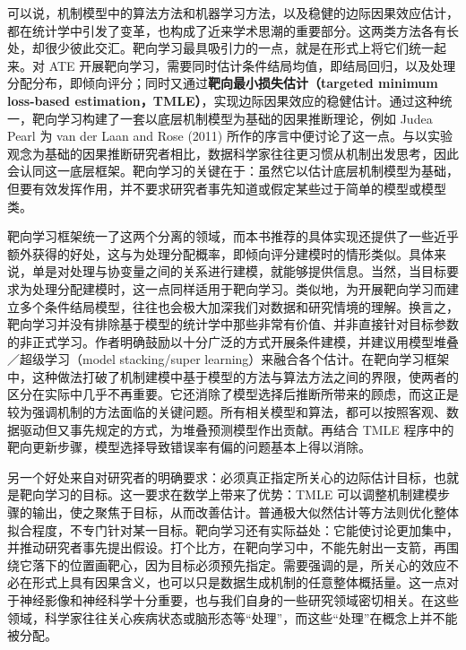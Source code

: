 可以说，机制模型中的算法方法和机器学习方法，以及稳健的边际因果效应估计，都在统计学中引发了变革，也构成了近来学术思潮的重要部分。这两类方法各有长处，却很少彼此交汇。靶向学习最具吸引力的一点，就是在形式上将它们统一起来。对 ATE 开展靶向学习，需要同时估计条件结局均值，即结局回归，以及处理分配分布，即倾向评分；同时又通过\textbf{靶向最小损失估计（targeted minimum loss-based estimation，TMLE）}，实现边际因果效应的稳健估计。通过这种统一，靶向学习构建了一套以底层机制模型为基础的因果推断理论，例如 Judea Pearl 为 van der Laan and Rose (2011) 所作的序言中便讨论了这一点。与以实验观念为基础的因果推断研究者相比，数据科学家往往更习惯从机制出发思考，因此会认同这一底层框架。靶向学习的关键在于：虽然它以估计底层机制模型为基础，但要有效发挥作用，并不要求研究者事先知道或假定某些过于简单的模型或模型类。

靶向学习框架统一了这两个分离的领域，而本书推荐的具体实现还提供了一些近乎额外获得的好处，这与为处理分配概率，即倾向评分建模时的情形类似。具体来说，单是对处理与协变量之间的关系进行建模，就能够提供信息。当然，当目标要求为处理分配建模时，这一点同样适用于靶向学习。类似地，为开展靶向学习而建立多个条件结局模型，往往也会极大加深我们对数据和研究情境的理解。换言之，靶向学习并没有排除基于模型的统计学中那些非常有价值、并非直接针对目标参数的非正式学习。作者明确鼓励以十分广泛的方式开展条件建模，并建议用模型堆叠／超级学习（model stacking/super learning）来融合各个估计。在靶向学习框架中，这种做法打破了机制建模中基于模型的方法与算法方法之间的界限，使两者的区分在实际中几乎不再重要。它还消除了模型选择后推断所带来的顾虑，而这正是较为强调机制的方法面临的关键问题。所有相关模型和算法，都可以按照客观、数据驱动但又事先规定的方式，为堆叠预测模型作出贡献。再结合 TMLE 程序中的靶向更新步骤，模型选择导致错误率有偏的问题基本上得以消除。

另一个好处来自对研究者的明确要求：必须真正指定所关心的边际估计目标，也就是靶向学习的目标。这一要求在数学上带来了优势：TMLE 可以调整机制建模步骤的输出，使之聚焦于目标，从而改善估计。普通极大似然估计等方法则优化整体拟合程度，不专门针对某一目标。靶向学习还有实际益处：它能使讨论更加集中，并推动研究者事先提出假设。打个比方，在靶向学习中，不能先射出一支箭，再围绕它落下的位置画靶心，因为目标必须预先指定。需要强调的是，所关心的效应不必在形式上具有因果含义，也可以只是数据生成机制的任意整体概括量。这一点对于神经影像和神经科学十分重要，也与我们自身的一些研究领域密切相关。在这些领域，科学家往往关心疾病状态或脑形态等“处理”，而这些“处理”在概念上并不能被分配。

